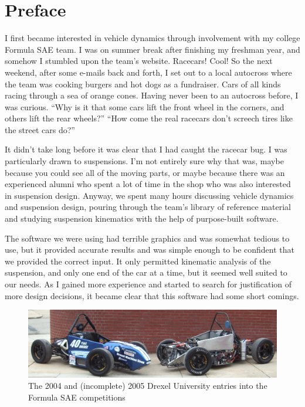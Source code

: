 \chapter{Preface}

I first became interested in vehicle dynamics through involvement with my college Formula SAE team.  I was on summer break after finishing my freshman year, and somehow I stumbled upon the team's website.  Racecars!  Cool!  So the next weekend, after some e-mails back and forth, I set out to a local autocross where the team was cooking burgers and hot dogs as a fundraiser.  Cars of all kinds racing through a sea of orange cones.  Having never been to an autocross before, I was curious.  ``Why is it that some cars lift the front wheel in the corners, and others lift the rear wheels?''  ``How come the real racecars don't screech tires like the street cars do?''

It didn't take long before it was clear that I had caught the racecar bug.  I was particularly drawn to suspensions.  I'm not entirely sure why that was, maybe because you could see all of the moving parts, or maybe because there was an experienced alumni who spent a lot of time in the shop who was also interested in suspension design.  Anyway, we spent many hours discussing vehicle dynamics and suspension design, pouring through the team's library of reference material and studying suspension kinematics with the help of purpose-built software.

The software we were using had terrible graphics and was somewhat tedious to use, but it provided accurate results and was simple enough to be confident that we provided the correct input.  It only permitted kinematic analysis of the suspension, and only one end of the car at a time, but it seemed well suited to our needs.  As I gained more experience and started to search for justification of more design decisions, it became clear that this software had some short comings.



\begin{figure}
\includegraphics[width=\textwidth]{images/04-05cars}
\caption{The 2004 and (incomplete) 2005 Drexel University entries into the Formula SAE competitions}
\centering
\end{figure}